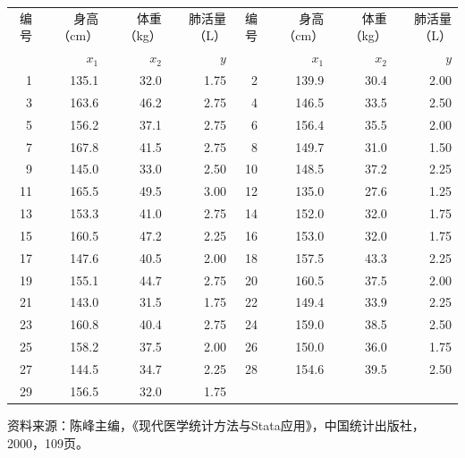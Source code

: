 \par\noindent\begin{minipage}{\linewidth}
\begin{center}\small\begin{tabular}{rrrr@{\qquad}rrrr}
\toprule 编号&身高（cm）&体重（kg）&肺活量（L）&编号&身高（cm）&体重（kg）&肺活量（L）\\
&$x_1$&$x_2$&$y$&&$x_1$&$x_2$&$y$\\\midrule
1&135.1&32.0&1.75&2&139.9&30.4&2.00\\
3&163.6&46.2&2.75&4&146.5&33.5&2.50\\
5&156.2&37.1&2.75&6&156.4&35.5&2.00\\
7&167.8&41.5&2.75&8&149.7&31.0&1.50\\
9&145.0&33.0&2.50&10&148.5&37.2&2.25\\
11&165.5&49.5&3.00&12&135.0&27.6&1.25\\
13&153.3&41.0&2.75&14&152.0&32.0&1.75\\
15&160.5&47.2&2.25&16&153.0&32.0&1.75\\
17&147.6&40.5&2.00&18&157.5&43.3&2.25\\
19&155.1&44.7&2.75&20&160.5&37.5&2.00\\
21&143.0&31.5&1.75&22&149.4&33.9&2.25\\
23&160.8&40.4&2.75&24&159.0&38.5&2.50\\
25&158.2&37.5&2.00&26&150.0&36.0&1.75\\
27&144.5&34.7&2.25&28&154.6&39.5&2.50\\
29&156.5&32.0&1.75&&&&\\\bottomrule
\end{tabular}\end{center}
\end{minipage}\par\medskip
{\small 资料来源：陈峰主编，《现代医学统计方法与Stata应用》，中国统计出版社，2000，109页。}


